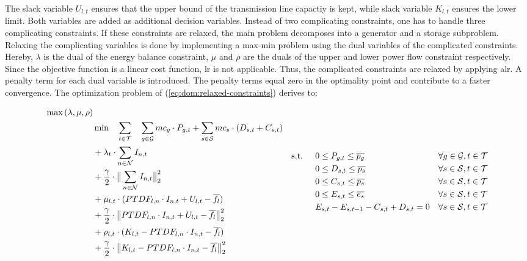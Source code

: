 The slack variable $U_{l,t}$ ensures that the upper bound of the transmission line capactiy is kept, while slack variable $K_{l,t}$ ensures the lower limit. Both variables are added as additional decision variables. Instead of two complicating constraints, one has to handle three complicating constraints. If these constraints are relaxed, the main problem decomposes into a generator and a storage subproblem.\\

Relaxing the complicating variables is done by implementing a max-min problem using the dual variables of the complicated constraints. Hereby, $\lambda$ is the dual of the energy balance constraint, $\mu$ and $\rho$ are the duals of the upper and lower power flow constraint respectively. Since the objective function is a linear cost function, \gls{lr} is not applicable. Thus, the complicated constraints are relaxed by applying \gls{alr}. A penalty term for each dual variable is introduced. The penalty terms equal zero in the optimality point and contribute to a faster convergence. The optimization problem of (\ref{eq:dom:relaxed-constraints}) derives to:

\begin{subequations}
	\begin{align}
		\max{(\lambda, \mu, \rho)} \label{eq:dom:fixed-duals} \\
		 & \min \quad \sum_{t\in\mathcal{T}} \quad \sum_{g\in\mathcal{G}}mc_g \cdot P_{g,t} + \sum_{s\in\mathcal{S}}mc_s \cdot (D_{s,t}+C_{s,t}) \nonumber \\
		 & + \lambda_t \cdot \sum_{n \in \mathcal{N}} I_{n,t} \nonumber \\
		 & + \frac{\gamma}{2} \cdot \big\|\sum_{n \in \mathcal{N}} I_{n,t}\big\|^2_2 \nonumber \\
		 & + \mu_{l,t} \cdot (PTDF_{l,n} \cdot I_{n,t} + U_{l,t} - \overline{f_l}) \nonumber \\
		 & + \frac{\gamma}{2} \cdot \big\| PTDF_{l,n} \cdot I_{n,t} + U_{l,t} - \overline{f_l} \big\|^2_2 \nonumber \\
		 & + \rho_{l,t} \cdot (K_{l,t} - PTDF_{l,n} \cdot I_{n,t} - \overline{f_l}) \nonumber \\
		 & + \frac{\gamma}{2} \cdot \big\|K_{l,t} - PTDF_{l,n} \cdot I_{n,t} - \overline{f_l} \big\|^2_2 \nonumber
	\end{align}
	\begin{align}
		 \text{s.t. } \quad & 0 \leq P_{g,t} \leq \overline{p_g} && \forall g \in \set{G}, t \in \set{T}\\
		 & 0 \leq D_{s,t} \leq \overline{p_s} && \forall s \in \set{S}, t \in \set{T} \\
		 & 0 \leq C_{s,t} \leq \overline{p_s} && \forall s \in \set{S}, t \in \set{T} \\
		 & 0 \leq E_{s,t} \leq \overline{e_s} && \forall s \in \set{S}, t \in \set{T} \\
		 & E_{s,t} - E_{s,t-1} - C_{s,t} + D_{s,t} = 0 && \forall s \in \set{S}, t \in \set{T}
	\end{align}
\end{subequations}

